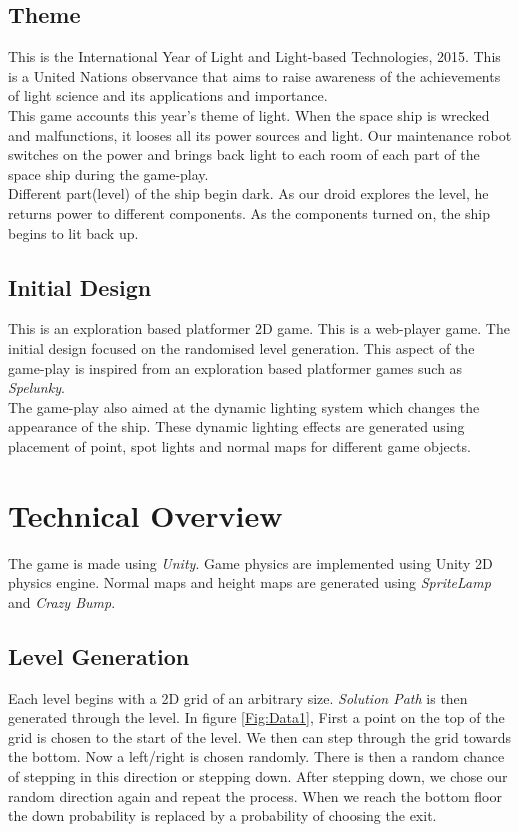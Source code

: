 \documentclass[11pt]{article}
\begin{document}
\subsection{Theme}
This is the International Year of Light and Light-based Technologies, 2015. This is a United Nations observance that aims to raise awareness of the achievements of light science and its applications and importance.\\

This game accounts this year's theme of light. When the space ship is wrecked and malfunctions, it looses all its power sources and light. Our maintenance robot switches on the power and brings back light to each room of each part of the space ship during the game-play.\\

Different part(level) of the ship begin dark. As our droid explores the level, he returns power to different components. As the components turned on, the ship begins to lit back up. 
\subsection{Initial Design}
This is an exploration based platformer 2D game. This is a web-player game. The initial design focused on the randomised level generation. This aspect of the game-play is inspired from an exploration based platformer games such as \textit{Spelunky}.\\

The game-play also aimed at the dynamic lighting system which changes the appearance of the ship. These dynamic lighting effects are generated  using placement of point, spot lights and normal maps for different game objects.
\section{Technical Overview}
The game is made using \textit{Unity}. Game physics are implemented using Unity 2D physics engine. Normal maps and height maps are generated using \textit{SpriteLamp} and \textit{Crazy Bump}.
\subsection{Level Generation}
Each level begins with a 2D grid of an arbitrary size. \textit{Solution Path} is then generated through the level. In figure \ref{Fig:Data1}, First a point on the top of the grid is chosen to the start of the level. We then can step through the grid towards the bottom. Now a left/right is chosen randomly. There is then a random chance of stepping in this direction or stepping down. After stepping down, we chose our random direction again and repeat the process. When we reach the bottom floor the down probability is replaced by a probability of choosing the exit.\\
\end{document}
